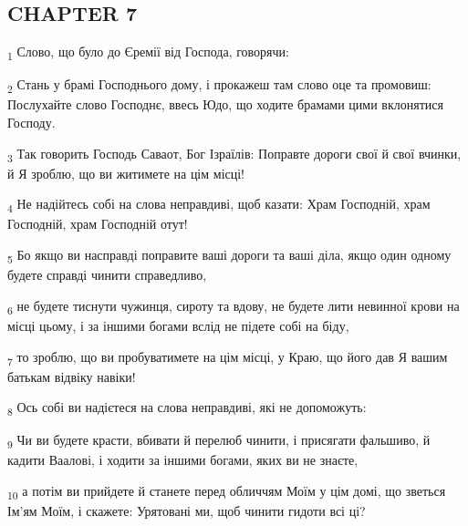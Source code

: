 \subsection{CHAPTER 7}
\begin{tcolorbox}
\textsubscript{1} Слово, що було до Єремії від Господа, говорячи:
\end{tcolorbox}
\begin{tcolorbox}
\textsubscript{2} Стань у брамі Господнього дому, і прокажеш там слово оце та промовиш: Послухайте слово Господнє, ввесь Юдо, що ходите брамами цими вклонятися Господу.
\end{tcolorbox}
\begin{tcolorbox}
\textsubscript{3} Так говорить Господь Саваот, Бог Ізраїлів: Поправте дороги свої й свої вчинки, й Я зроблю, що ви житимете на цім місці!
\end{tcolorbox}
\begin{tcolorbox}
\textsubscript{4} Не надійтесь собі на слова неправдиві, щоб казати: Храм Господній, храм Господній, храм Господній отут!
\end{tcolorbox}
\begin{tcolorbox}
\textsubscript{5} Бо якщо ви насправді поправите ваші дороги та ваші діла, якщо один одному будете справді чинити справедливо,
\end{tcolorbox}
\begin{tcolorbox}
\textsubscript{6} не будете тиснути чужинця, сироту та вдову, не будете лити невинної крови на місці цьому, і за іншими богами вслід не підете собі на біду,
\end{tcolorbox}
\begin{tcolorbox}
\textsubscript{7} то зроблю, що ви пробуватимете на цім місці, у Краю, що його дав Я вашим батькам відвіку навіки!
\end{tcolorbox}
\begin{tcolorbox}
\textsubscript{8} Ось собі ви надієтеся на слова неправдиві, які не допоможуть:
\end{tcolorbox}
\begin{tcolorbox}
\textsubscript{9} Чи ви будете красти, вбивати й перелюб чинити, і присягати фальшиво, й кадити Ваалові, і ходити за іншими богами, яких ви не знаєте,
\end{tcolorbox}
\begin{tcolorbox}
\textsubscript{10} а потім ви прийдете й станете перед обличчям Моїм у цім домі, що зветься Ім'ям Моїм, і скажете: Урятовані ми, щоб чинити гидоти всі ці?
\end{tcolorbox}
